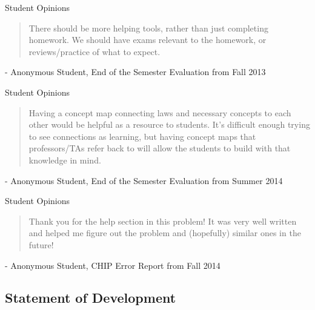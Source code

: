 \documentclass{beamer}
\begin{document}
\begin{frame}{Student Opinions}
\begin{quote}
There should be more helping tools, rather than just completing homework. We should have exams relevant to the homework, or reviews/practice of what to expect.
\end{quote}
- Anonymous Student, End of the Semester Evaluation from Fall 2013
\end{frame}

\begin{frame}{Student Opinions}
\begin{quote}
Having a concept map connecting laws and necessary concepts to each other would be helpful as a resource to students. It's difficult enough trying to see connections as learning, but having concept maps that professors/TAs refer back to will allow the students to build with that knowledge in mind.
\end{quote}
- Anonymous Student, End of the Semester Evaluation from Summer 2014
\end{frame}

\begin{frame}{Student Opinions}
\begin{quote}
Thank you for the help section in this problem! It was very well written and helped me figure out the problem and (hopefully) similar ones in the future!
\end{quote}
- Anonymous Student, CHIP Error Report from Fall 2014
\end{frame}

\subsection*{Statement of Development}
\end{document}
